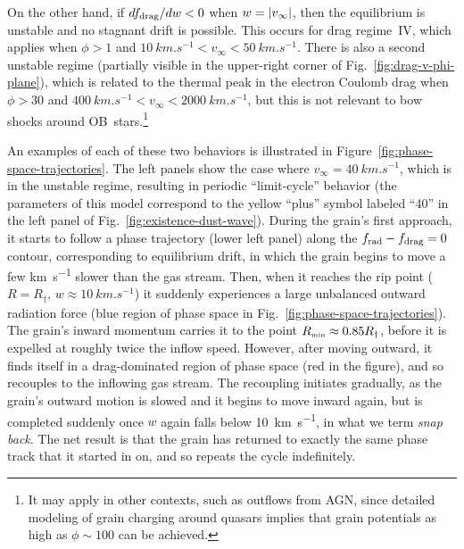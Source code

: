 On the other hand, if \(d f_{\text{drag}} / d w < 0\) when
\(w = \lvert v_\infty\rvert\), then the equilibrium is unstable and no stagnant
drift is possible.  This occurs for drag regime~IV, which applies when
\(\phi > 1\) and
\(\SI{10}{km.s^{-1}} < v_\infty < \SI{50}{km.s^{-1}}\).  There is also a
second unstable regime (partially visible in the upper-right corner of
Fig.~\ref{fig:drag-v-phi-plane}), which is related to the thermal peak
in the electron Coulomb drag when \(\phi > 30\) and
\(\SI{400}{km.s^{-1}} < v_\infty < \SI{2000}{km.s^{-1}}\), but this is not
relevant to bow shocks around OB~stars.\footnote{%
  It may apply in other contexts, such as outflows from AGN, since
  detailed modeling of grain charging around quasars
  \citep{Weingartner:2006a} implies that grain potentials as high as
  \(\phi \sim 100\) can be achieved.} %

An examples of each of these two behaviors is illustrated in
Figure~\ref{fig:phase-space-trajectories}.  The left panels show the
case where \(v_\infty = \SI{40}{km.s^{-1}}\), which is in the unstable
regime, resulting in periodic ``limit-cycle'' behavior (the parameters
of this model correspond to the yellow ``plus'' symbol labeled ``40''
in the left panel of Fig.~\ref{fig:existence-dust-wave}).  During the
grain's first approach, it starts to follow a phase trajectory (lower
left panel) along the \(f_{\text{rad}} - f_{\text{drag}} = 0\) contour, corresponding to
equilibrium drift, in which the grain begins to move a few
\si{km.s^{-1}} slower than the gas stream.  Then, when it reaches the
rip point (\(R = R_\dag\), \(w \approx \SI{10}{km.s^{-1}}\)) it suddenly
experiences a large unbalanced outward radiation force (blue region of
phase space in Fig.~\ref{fig:phase-space-trajectories}). The grain's
inward momentum carries it to the point \(R_{\scriptscriptstyle\text{min}} \approx 0.85 R_\dag\), before
it is expelled at roughly twice the inflow speed.  However, after
moving outward, it finds itself in a drag-dominated region of phase
space (red in the figure), and so recouples to the inflowing gas
stream.  The recoupling initiates gradually, as the grain's outward
motion is slowed and it begins to move inward again, but is completed
suddenly once \(w\) again falls below \SI{10}{km.s^{-1}}, in what we
term \textit{snap back}. The net result is that the grain has returned
to exactly the same phase track that it started in on, and so repeats
the cycle indefinitely.

